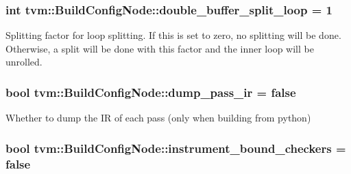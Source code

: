 \subsubsection[{\texorpdfstring{double\+\_\+buffer\+\_\+split\+\_\+loop}{double_buffer_split_loop}}]{\setlength{\rightskip}{0pt plus 5cm}int tvm\+::\+Build\+Config\+Node\+::double\+\_\+buffer\+\_\+split\+\_\+loop = 1}\hypertarget{classtvm_1_1BuildConfigNode_a86e454b099b0da8bf58b0116ac052241}{}\label{classtvm_1_1BuildConfigNode_a86e454b099b0da8bf58b0116ac052241}


Splitting factor for loop splitting. If this is set to zero, no splitting will be done. Otherwise, a split will be done with this factor and the inner loop will be unrolled. 

\subsubsection[{\texorpdfstring{dump\+\_\+pass\+\_\+ir}{dump_pass_ir}}]{\setlength{\rightskip}{0pt plus 5cm}bool tvm\+::\+Build\+Config\+Node\+::dump\+\_\+pass\+\_\+ir = false}\hypertarget{classtvm_1_1BuildConfigNode_a63ece2a7d9dd4ffdfc2116ed9eee12a3}{}\label{classtvm_1_1BuildConfigNode_a63ece2a7d9dd4ffdfc2116ed9eee12a3}


Whether to dump the IR of each pass (only when building from python) 

\subsubsection[{\texorpdfstring{instrument\+\_\+bound\+\_\+checkers}{instrument_bound_checkers}}]{\setlength{\rightskip}{0pt plus 5cm}bool tvm\+::\+Build\+Config\+Node\+::instrument\+\_\+bound\+\_\+checkers = false}\hypertarget{classtvm_1_1BuildConfigNode_a01df805ead94051622f60457e916e9cc}{}\label{classtvm_1_1BuildConfigNode_a01df805ead94051622f60457e916e9cc}



